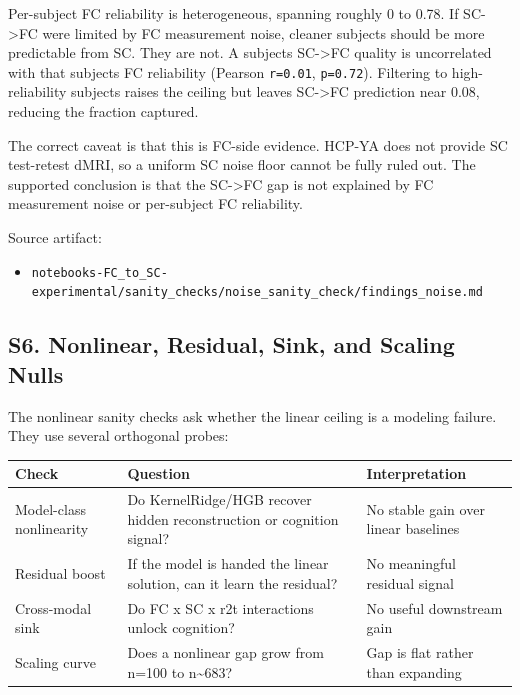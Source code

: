 Per-subject FC reliability is heterogeneous, spanning roughly 0 to 0.78. If SC-\textgreater FC were limited by FC measurement noise, cleaner subjects should be more predictable from SC. They are not. A subject\textquotesingle s SC-\textgreater FC quality is uncorrelated with that subject\textquotesingle s FC reliability (Pearson \texttt{r=0.01}, \texttt{p=0.72}). Filtering to high-reliability subjects raises the ceiling but leaves SC-\textgreater FC prediction near 0.08, reducing the fraction captured.

The correct caveat is that this is FC-side evidence. HCP-YA does not provide SC test-retest dMRI, so a uniform SC noise floor cannot be fully ruled out. The supported conclusion is that the SC-\textgreater FC gap is not explained by FC measurement noise or per-subject FC reliability.

Source artifact:

\begin{itemize}
\tightlist
\item
  \texttt{notebooks-FC\_to\_SC-experimental/sanity\_checks/noise\_sanity\_check/findings\_noise.md}
\end{itemize}

\subsection{S6. Nonlinear, Residual, Sink, and Scaling Nulls}\label{s6-nonlinear-residual-sink-and-scaling-nulls}

The nonlinear sanity checks ask whether the linear ceiling is a modeling failure. They use several orthogonal probes:

{\def\LTcaptype{none} %
\begin{longtable}[]{@{}lll@{}}
\toprule\noalign{}
Check & Question & Interpretation \\
\midrule\noalign{}
\endhead
\bottomrule\noalign{}
\endlastfoot
Model-class nonlinearity & Do KernelRidge/HGB recover hidden reconstruction or cognition signal? & No stable gain over linear baselines \\
Residual boost & If the model is handed the linear solution, can it learn the residual? & No meaningful residual signal \\
Cross-modal sink & Do FC x SC x r2t interactions unlock cognition? & No useful downstream gain \\
Scaling curve & Does a nonlinear gap grow from n=100 to n\textasciitilde683? & Gap is flat rather than expanding \\
\end{longtable}
}

